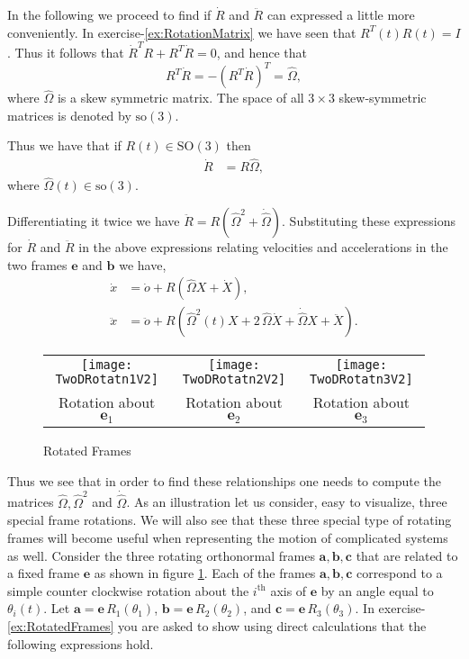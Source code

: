 \documentclass[graybox,envcountchap,sectrefs]{svmonoMuga}
\begin{document}
In the following we proceed to find if $\dot{R}$ and $\ddot{R}$ can expressed a little more conveniently.
In exercise-\ref{ex:RotationMatrix} we have seen that $R^T(t)R(t)=I$. Thus it follows that $\dot{R}^TR+R^T\dot{R}=0$,
and hence that
\[
R^T\dot{R}=-(R^T\dot{R})^T=\widehat{\Omega},
\]
where $\widehat{\Omega}$ is a skew symmetric matrix. The space of all $3\times 3$ skew-symmetric matrices is denoted by $\mathrm{so}(3)$. 
\begin{svgraybox}
Thus we have that if $R(t)\in \mathrm{SO}(3)$ then
\begin{align}
\dot{R}&=R\widehat{\Omega},\label{eq:RdotEqn}
\end{align}
where  $\widehat{\Omega}(t)\in \mathrm{so}(3)$.
\end{svgraybox}
Differentiating it twice we have $\ddot{R}=R(\widehat{\Omega}^2+\dot{\widehat{\Omega}})$.
Substituting these expressions for $\dot{R}$ and $\ddot{R}$ in the above expressions relating velocities and accelerations in the two frames $\mathbf{e}$ and $\mathbf{b}$ we have,
\begin{align}
\dot{x}&=\dot{o}+R\left(\widehat{\Omega} X+\dot{X}\right),\label{eq:VelocityMoving2Fixed2}\\
\ddot{x}&= \ddot{o}+R\left(\widehat{\Omega}^2(t) X+2\,\widehat{\Omega}\dot{X}+\dot{\widehat{\Omega}}X+\ddot{X}\right).\label{eq:InertialAccInBodyFrame}
\end{align}

\begin{figure}[ht]
\begin{center}
\begin{tabular}{ccc}
\texttt{[image: TwoDRotatn1V2]} & \texttt{[image: TwoDRotatn2V2]} & \texttt{[image: TwoDRotatn3V2]}\\
Rotation about $\mathbf{e}_1$ & Rotation about $\mathbf{e}_2$ & Rotation about $\mathbf{e}_3$ 
\end{tabular}
\renewcommand{\baselinestretch}{1}\selectfont
\caption{Rotated Frames}
\label{Fig:TwoDRotatnFrames}
\renewcommand{\baselinestretch}{1.5}\selectfont
\end{center}
\end{figure}



Thus we see that in order to find these relationships one needs to compute the matrices $\widehat{\Omega},\widehat{\Omega}^2$ and $\dot{\widehat{\Omega}}$. 
As an illustration let us consider, easy to visualize, three special frame rotations. We will also see that these three special type of rotating frames will become useful when representing the motion of complicated systems as well.
Consider the three rotating orthonormal frames $\mathbf{a},\mathbf{b},\mathbf{c}$ that are related to a fixed frame $\mathbf{e}$ as shown in figure \ref{Fig:TwoDRotatnFrames}. Each of the frames $\mathbf{a},\mathbf{b},\mathbf{c}$ correspond to a simple counter clockwise rotation about the $i^{\mathrm{th}}$ axis of $\mathbf{e}$ by an angle equal to $\theta_i(t)$. Let $\mathbf{a}=\mathbf{e}\, R_1{(\theta_1)}$, $\mathbf{b}=\mathbf{e} \,R_2{(\theta_2)}$,
and $\mathbf{c}=\mathbf{e}\, R_3{(\theta_3)}$. In exercise-\ref{ex:RotatedFrames} you are asked to show using direct calculations that the following expressions hold.
\end{document}
